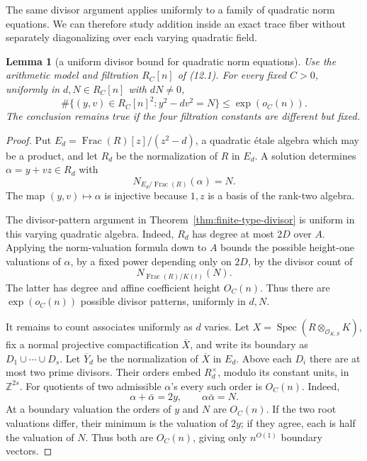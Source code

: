 \documentclass[11pt,reqno]{amsart}
\newtheorem{lemma}[theorem]{Lemma}
\theoremstyle{definition}
\theoremstyle{remark}
\newcommand{\Z}{\mathbb Z}
\newcommand{\cO}{\mathcal O}
\begin{document}
The same divisor argument applies uniformly to a family of quadratic norm
equations.  We can therefore study addition inside an exact trace fiber
without separately diagonalizing over each varying quadratic field.

\begin{lemma}[a uniform divisor bound for quadratic norm equations]
\label{lem:quadratic-norm-divisor}
Use the arithmetic model and filtration \(R_C[n]\) of (12.1).  For every
fixed \(C>0\), uniformly in \(d,N\in R_C[n]\) with \(dN\ne0\),
\[
 \#\{(y,v)\in R_C[n]^2:y^2-dv^2=N\}\le\exp(o_C(n)).
\]
The conclusion remains true if the four filtration constants are different
but fixed.
\end{lemma}

\begin{proof}
Put \(E_d=\operatorname{Frac}(R)[z]/(z^2-d)\), a quadratic \'etale
algebra which may be a product, and let \(R_d\) be the normalization of
\(R\) in \(E_d\).  A solution determines \(\alpha=y+vz\in R_d\) with
\[
 N_{E_d/\operatorname{Frac}(R)}(\alpha)=N.
\]
The map \((y,v)\mapsto\alpha\) is injective because \(1,z\) is a basis of
the rank-two algebra.

The divisor-pattern argument in Theorem~\ref{thm:finite-type-divisor} is
uniform in this varying quadratic algebra.  Indeed, \(R_d\) has degree at
most \(2D\) over \(A\).  Applying the norm-valuation formula down to \(A\)
bounds the possible height-one valuations of \(\alpha\), by a fixed power
depending only on \(2D\), by the divisor count of
\[
 N_{\operatorname{Frac}(R)/K(t)}(N).
\]
The latter has degree and affine coefficient height \(O_C(n)\).  Thus there
are \(\exp(o_C(n))\) possible divisor patterns, uniformly in \(d,N\).

It remains to count associates uniformly as \(d\) varies.  Let
\(X=\operatorname{Spec}(R\otimes_{\cO_{K,S}}K)\), fix a normal projective
compactification \(\overline X\), and write its boundary as
\(D_1\cup\cdots\cup D_s\).  Let \(\overline Y_d\) be the normalization of
\(\overline X\) in \(E_d\).  Above each \(D_i\) there are at most two prime
divisors.  Their orders embed \(R_d^\times\), modulo its constant units, in
\(\Z^{2s}\).  For quotients of two admissible \(\alpha\)'s every such order
is \(O_C(n)\).  Indeed,
\[
 \alpha+\bar\alpha=2y,\qquad \alpha\bar\alpha=N.
\]
At a boundary valuation the orders of \(y\) and \(N\) are \(O_C(n)\).  If
the two root valuations differ, their minimum is the valuation of \(2y\);
if they agree, each is half the valuation of \(N\).  Thus both are
\(O_C(n)\), giving only \(n^{O(1)}\) boundary vectors.


\end{proof}
\end{document}
